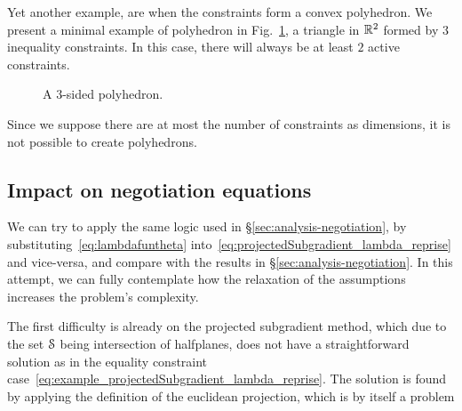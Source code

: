 \documentclass[../main.tex]{subfiles}
\begin{document}
Yet another example, are when the constraints form a convex polyhedron.
We present a minimal example of polyhedron in Fig.~\ref{fig:triangle_inequality}, a triangle in $\mathbb{R}^{2}$ formed by $3$ inequality constraints.
In this case, there will always be at least $2$ active constraints.
\begin{figure}[h]
  \centering
  \caption{A $3$-sided polyhedron.}\label{fig:triangle_inequality}
\end{figure}

Since we suppose there are at most the number of constraints as dimensions, it is not possible to create polyhedrons.

\subsection{Impact on negotiation equations}\label{sec:impact-local-problem}
We can try to apply the same logic used in \S\ref{sec:analysis-negotiation}, by substituting~\eqref{eq:lambdafuntheta} into~\eqref{eq:projectedSubgradient_lambda_reprise} and vice-versa, and compare with the results in \S\ref{sec:analysis-negotiation}.
In this attempt, we can fully contemplate how the relaxation of the assumptions increases the problem's complexity.

The first difficulty is already on the projected subgradient method, which due to the set
$\mathcal{S}$ being intersection of halfplanes, does not have a straightforward solution as in the equality constraint case~\eqref{eq:example_projectedSubgradient_lambda_reprise}. The solution is found by applying the definition of the euclidean projection, which is by itself a \qp{} problem
\end{document}
